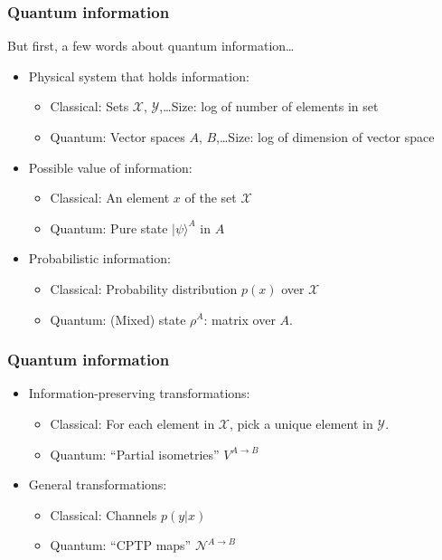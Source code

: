 \documentclass[12pt]{beamer}
\newcommand{\ket}[1]{|#1 \rangle}
\begin{document}
\begin{frame}
\frametitle{Quantum information}
But first, a few words about quantum information\ldots
\begin{itemize}
\item Physical system that holds information:
\begin{itemize}
\item Classical: Sets $\mathcal{X}$, $\mathcal{Y}$,\ldots Size: log of number of elements in set
\item Quantum: Vector spaces $A$, $B$,\ldots Size: log of dimension of vector space
\end{itemize}
\item Possible value of information:
\begin{itemize}
\item Classical: An element $x$ of the set $\mathcal{X}$
\item Quantum: Pure state $\ket{\psi}^A$ in $A$
\end{itemize}
\item Probabilistic information:
\begin{itemize}
\item Classical: Probability distribution $p(x)$ over $\mathcal{X}$
\item Quantum: (Mixed) state $\rho^A$: matrix over $A$.
\end{itemize}
\end{itemize}
\end{frame}

\begin{frame}
\frametitle{Quantum information}
\begin{itemize}
\item Information-preserving transformations:
\begin{itemize}
	\item Classical: For each element in $\mathcal{X}$, pick a unique element in $\mathcal{Y}$.
\item Quantum: ``Partial isometries'' $V^{A \rightarrow B}$
\end{itemize}
\item General transformations:
\begin{itemize}
\item Classical: Channels $p(y|x)$
\item Quantum: ``CPTP maps'' $\mathcal{N}^{A \rightarrow B}$
\end{itemize}
\end{itemize}
\end{frame}
\end{document}
